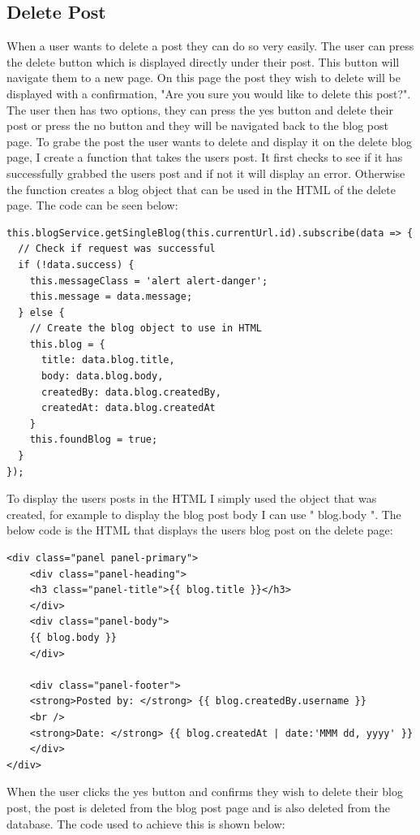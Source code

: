 \subsection{Delete Post}
When a user wants to delete a post they can do so very easily. The user can press the delete button which is displayed directly under their post. This button will navigate them to a new page. On this page the post they wish to delete will be displayed with a confirmation, "Are you sure you would like to delete this post?". The user then has two options, they can press the yes button and delete their post or press the no button and they will be navigated back to the blog post page. To grabe the post the user wants to delete and display it on the delete blog page, I create a function that takes the users post. It first checks to see if it has successfully grabbed the users post and if not it will display an error. Otherwise the function creates a blog object that can be used in the HTML of the delete page. The code can be seen below:


\begin{lstlisting}
this.blogService.getSingleBlog(this.currentUrl.id).subscribe(data => {
  // Check if request was successful
  if (!data.success) {
    this.messageClass = 'alert alert-danger'; 
    this.message = data.message; 
  } else {
    // Create the blog object to use in HTML
    this.blog = {
      title: data.blog.title,
      body: data.blog.body,
      createdBy: data.blog.createdBy,
      createdAt: data.blog.createdAt
    }
    this.foundBlog = true;
  }
});
\end{lstlisting}

To display the users posts in the HTML I simply used the object that was created, for example to display the blog post body I can use "{{ blog.body }}". The below code is the HTML that displays the users blog post on the delete page:
\begin{lstlisting}
<div class="panel panel-primary">
    <div class="panel-heading">
    <h3 class="panel-title">{{ blog.title }}</h3>
    </div>
    <div class="panel-body">
    {{ blog.body }}
    </div>

    <div class="panel-footer">
    <strong>Posted by: </strong> {{ blog.createdBy.username }}
    <br />
    <strong>Date: </strong> {{ blog.createdAt | date:'MMM dd, yyyy' }}
    </div>
</div>
\end{lstlisting}

When the user clicks the yes button and confirms they wish to delete their blog post, the post is deleted from the blog post page and is also deleted from the database. The code used to achieve this is shown below:

